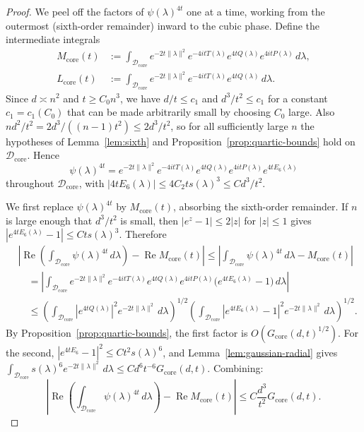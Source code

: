 \documentclass[11pt]{article}
\theoremstyle{definition}
\newcommand{\corereg}{\mathcal{D}_\mathrm{core}}
\newcommand{\RePart}{\operatorname{Re}}
\newcommand{\core}{G_{\mathrm{core}}}
\begin{document}
\begin{proof}
We peel off the factors of \(\psi(\lambda)^{4t}\) one at a time, working from the outermost (sixth-order remainder) inward to the cubic phase. Define the intermediate integrals
\[
  \begin{aligned}
    M_{\mathrm{core}}(t)
    &:=
    \int_{\corereg}
      e^{-2t\|\lambda\|^2}
      e^{-4itT(\lambda)}
      e^{4tQ(\lambda)}
      e^{4itP(\lambda)}
      \,d\lambda,\\
    L_{\mathrm{core}}(t)
    &:=
    \int_{\corereg}
      e^{-2t\|\lambda\|^2}
      e^{-4itT(\lambda)}
      e^{4tQ(\lambda)}
      \,d\lambda.
  \end{aligned}
\]
Since \(d\asymp n^2\) and \(t\ge C_0 n^3\), we have \(d/t\le c_1\) and \(d^3/t^2\le c_1\) for a constant \(c_1=c_1(C_0)\) that can be made arbitrarily small by choosing \(C_0\) large. Also
\(nd^2/t^2=2d^3/((n-1)t^2)\le 2d^3/t^2\),
so for all sufficiently large \(n\) the hypotheses of Lemma~\ref{lem:sixth} and Proposition~\ref{prop:quartic-bounds} hold on \(\corereg\). Hence
\[
  \psi(\lambda)^{4t}
  =e^{-2t\|\lambda\|^2}
    e^{-4itT(\lambda)}
    e^{4tQ(\lambda)}
    e^{4itP(\lambda)}
    e^{4tE_6(\lambda)}
\]
throughout \(\corereg\), with
\(|4tE_6(\lambda)|\le 4C_2t s(\lambda)^3\le Cd^3/t^2\).

We first replace \(\psi(\lambda)^{4t}\) by \(M_{\mathrm{core}}(t)\), absorbing the sixth-order remainder.
If \(n\) is large enough that \(d^3/t^2\) is small, then \(|e^z-1|\le 2|z|\) for \(|z|\le 1\) gives
\(|e^{4tE_6(\lambda)}-1|\le Ct s(\lambda)^3\).
Therefore
\begin{align*}
  &\left|
    \RePart\!\left(\int_{\corereg}\psi(\lambda)^{4t}\,d\lambda\right)-\RePart M_{\mathrm{core}}(t)
  \right|
\le
  \left|
    \int_{\corereg}\psi(\lambda)^{4t}\,d\lambda-M_{\mathrm{core}}(t)
  \right|\\
  &\quad=\left|\int_{\corereg}
    e^{-2t\|\lambda\|^2}
    e^{-4itT(\lambda)}
    e^{4tQ(\lambda)}
    e^{4itP(\lambda)}
    \bigl(e^{4tE_6(\lambda)}-1\bigr)\,d\lambda\right|\\
  &\quad\le
  \left(
    \int_{\corereg}|e^{4tQ(\lambda)}|^2e^{-2t\|\lambda\|^2}\,d\lambda
  \right)^{1/2}
  \left(
    \int_{\corereg}|e^{4tE_6(\lambda)}-1|^2e^{-2t\|\lambda\|^2}\,d\lambda
  \right)^{1/2}.
\end{align*}
By Proposition~\ref{prop:quartic-bounds}, the first factor is \(O(\core(d,t)^{1/2})\). For the second, \(|e^{4tE_6}-1|^2\le Ct^2s(\lambda)^6\), and Lemma~\ref{lem:gaussian-radial} gives \(\int_{\corereg}s(\lambda)^6e^{-2t\|\lambda\|^2}\,d\lambda\le Cd^6t^{-6}\core(d,t)\). Combining:
\[
  \left|
    \RePart\!\left(\int_{\corereg}\psi(\lambda)^{4t}\,d\lambda\right)-\RePart M_{\mathrm{core}}(t)
  \right|
  \le C\frac{d^3}{t^2}\core(d,t).
\]


\end{proof}
\end{document}
